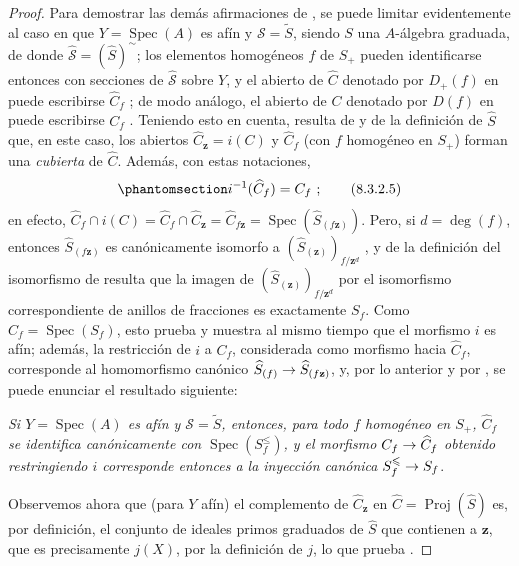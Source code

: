 \documentclass[oneside,10pt]{amsart}
\makeatletter
\renewcommand{\leq}{\leqslant}
\newcommand{\ega@arrow}[2]{\mathchoice{#1}{#2}{#2}{#2}}
\renewcommand{\to}{\ega@arrow{\longrightarrow}{\rightarrow}}
\newcommand{\oldpage}[2][]{\marginnote{\normalfont\footnotesize\textbf{#1}~|~#2}\ignorespaces}
\let\EGAOriginalLabel\label
\renewcommand{\label}[1]{\phantomsection\EGAOriginalLabel{#1}}
\makeatother
\begin{document}
\begin{proof}
Para demostrar las demás afirmaciones de , se puede limitar evidentemente al caso en que $Y=\operatorname{Spec}(A)$ es afín y $\mathcal{S}=\widetilde{S}$, siendo $S$ una $A$-álgebra graduada, de donde $\widehat{\mathcal{S}}=(\widehat{S})^{\sim}$;
los elementos homogéneos $f$ de $S_+$ pueden identificarse entonces con secciones de $\widehat{\mathcal{S}}$ sobre $Y$, y el abierto de $\widehat{C}$ denotado por $D_+(f)$ en  puede escribirse $\widehat{C}_f$ ;
de modo análogo, el abierto de $C$ denotado por $D(f)$ en  puede escribirse $C_f$ .
Teniendo esto en cuenta, resulta de  y de la definición de $\widehat{S}$ que, en este caso, los abiertos $\widehat{C}_{\mathbf{z}}=i(C)$ y $\widehat{C}_f$ (con $f$ homogéneo en $S_+$) forman una \emph{cubierta} de $\widehat{C}$.
Además, con estas notaciones,
\begin{equation}
\label{II.8.3.2.5-fr}
  i^{-1}(\widehat{C}_f)=C_f~;
\tag{8.3.2.5}
\end{equation}
en efecto, $\widehat{C}_f\cap i(C)=\widehat{C}_f\cap\widehat{C}_{\mathbf{z}}
=\widehat{C}_{f\mathbf{z}}=\operatorname{Spec}(\widehat{S}_{(f\mathbf{z})})$.
Pero, si $d=\deg(f)$, entonces $\widehat{S}_{(f\mathbf{z})}$ es canónicamente isomorfo a $(\widehat{S}_{(\mathbf{z})})_{f/\mathbf{z}^d}$ , y de la definición del isomorfismo de  resulta que la imagen de $(\widehat{S}_{(\mathbf{z})})_{f/\mathbf{z}^d}$ por el isomorfismo correspondiente de anillos de fracciones es exactamente $S_f$.
Como $C_f=\operatorname{Spec}(S_f)$, esto prueba  y muestra al mismo tiempo que el morfismo $i$ es afín;
además, la restricción de $i$ a $C_f$, considerada como morfismo hacia $\widehat{C}_f$, corresponde  al homomorfismo canónico $\widehat{S}_{(f)}\to\widehat{S}_{(f\mathbf{z})}$, y, por lo anterior y por , se puede enunciar el resultado siguiente:
\begin{env}[8.3.2.6]
\label{II.8.3.2.6-fr}
\emph{Si $Y=\operatorname{Spec}(A)$ es afín y $\mathcal{S}=\widetilde{S}$, entonces, para todo $f$ homogéneo en $S_+$, $\widehat{C}_f$ se identifica canónicamente con $\operatorname{Spec}(S_f^{\leq})$, y el morfismo $C_f\to\widehat{C}_f$ obtenido restringiendo $i$ corresponde entonces a la inyección canónica $S_f^{\leq}\to S_f$}.
\end{env}

Observemos ahora que (para $Y$ afín) el complemento de $\widehat{C}_{\mathbf{z}}$ en $\widehat{C}=\operatorname{Proj}(\widehat{S})$
\oldpage[II]{164}
es, por definición, el conjunto de ideales primos graduados de $\widehat{S}$ que contienen a $\mathbf{z}$, que es precisamente $j(X)$, por la definición de $j$, lo que prueba .


\end{proof}
\end{document}
